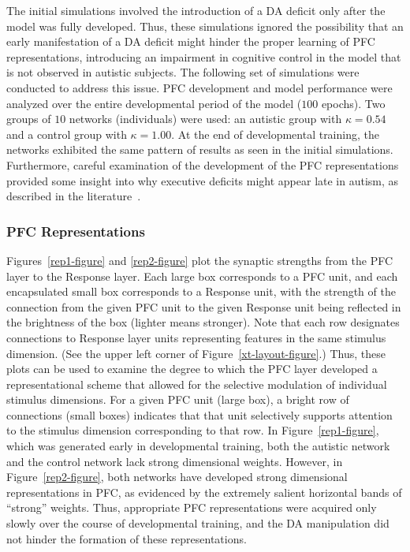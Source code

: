 The initial simulations involved the introduction of a DA deficit only
after the model was fully developed.  Thus, these simulations ignored
the possibility that an early manifestation of a DA deficit might
hinder the proper learning of PFC representations, introducing an
impairment in cognitive control in the model that is not observed in
autistic subjects.  The following set of simulations were conducted to
address this issue.   PFC
development and model performance were analyzed over the entire
developmental period of the model ($100$ epochs).  Two groups of $10$
networks (individuals) were used: an autistic group with $\kappa = 0.54$
and a control group with $\kappa = 1.00$.  At the end of developmental
training, the networks exhibited the same pattern of results as seen
in the initial simulations.  Furthermore, careful examination of the development of the PFC representations provided some insight into why executive deficits might
appear late in autism, as described in the
literature~\cite{GriffithEM:1999:AutismYoungED}.  

\subsubsection{PFC Representations} 

Figures~\ref{rep1-figure} and \ref{rep2-figure} plot the synaptic
strengths from the PFC layer to the Response layer.  Each large box
corresponds to a PFC unit, and each encapsulated small box corresponds
to a Response unit, with the strength of the connection from the given
PFC unit to the given Response unit being reflected in the brightness
of the box (lighter means stronger).  Note that each row designates
connections to Response layer units representing features in the same
stimulus dimension.  (See the upper left corner of
Figure~\ref{xt-layout-figure}.)  Thus, these plots can be used to
examine the degree to which the PFC layer developed a representational scheme that allowed for the selective modulation of individual stimulus dimensions.  For a given PFC unit (large box), a bright row of connections (small boxes) indicates that that unit selectively supports attention to the stimulus dimension corresponding to that row.  In
Figure~\ref{rep1-figure}, which was generated early in developmental
training, both the autistic network and the control network lack
strong dimensional weights.  However, in Figure~\ref{rep2-figure},
both networks have developed strong dimensional representations in
PFC, as evidenced by the extremely salient horizontal bands of
``strong'' weights.  Thus, appropriate PFC representations were
acquired only slowly over the course of developmental training, and
the DA manipulation did not hinder the formation of these
representations.

